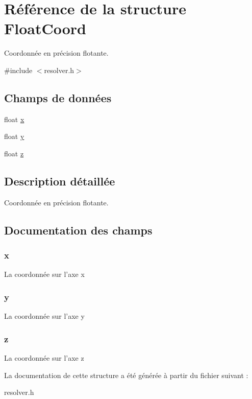 \hypertarget{struct_float_coord}{\section{Référence de la structure Float\-Coord}
\label{struct_float_coord}
}


Coordonnée en précision flotante.  




{\ttfamily \#include $<$resolver.\-h$>$}

\subsection*{Champs de données}
\begin{DoxyCompactItemize}
\item 
float \hyperlink{struct_float_coord_a9336ebf25087d91c818ee6e9ec29f8c1}{x}
\item 
float \hyperlink{struct_float_coord_a2fb1c5cf58867b5bbc9a1b145a86f3a0}{y}
\item 
float \hyperlink{struct_float_coord_a25ed1bcb423b0b7200f485fc5ff71c8e}{z}
\end{DoxyCompactItemize}


\subsection{Description détaillée}
Coordonnée en précision flotante. 

\subsection{Documentation des champs}
\hypertarget{struct_float_coord_a9336ebf25087d91c818ee6e9ec29f8c1}{
\subsubsection[{x}]{\setlength{\rightskip}{0pt plus 5cm}x}}\label{struct_float_coord_a9336ebf25087d91c818ee6e9ec29f8c1}
La coordonnée sur l'axe x \hypertarget{struct_float_coord_a2fb1c5cf58867b5bbc9a1b145a86f3a0}{
\subsubsection[{y}]{\setlength{\rightskip}{0pt plus 5cm}y}}\label{struct_float_coord_a2fb1c5cf58867b5bbc9a1b145a86f3a0}
La coordonnée sur l'axe y \hypertarget{struct_float_coord_a25ed1bcb423b0b7200f485fc5ff71c8e}{
\subsubsection[{z}]{\setlength{\rightskip}{0pt plus 5cm}z}}\label{struct_float_coord_a25ed1bcb423b0b7200f485fc5ff71c8e}
La coordonnée sur l'axe z 

La documentation de cette structure a été générée à partir du fichier suivant \-:\begin{DoxyCompactItemize}
\item 
resolver.\-h\end{DoxyCompactItemize}
